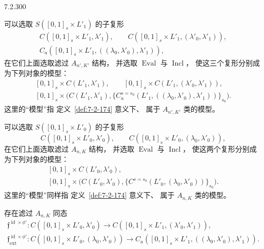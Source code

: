 
\begin{lemma}{7.2.300}\label{lem:7-2-300}
\par\noindent\textbullet\quad
可以选取 $S([0,1]_s\times L'_1)$ 的子复形
\[
\begin{gathered}
C([0,1]_s\times L'_1,\lambda'_1),\qquad
C([0,1]_s\times L'_1,(\lambda'_0,\lambda'_1)),\\
C_a([0,1]_s\times L'_1,((\lambda_0,\lambda'_0),\lambda'_1)),
\end{gathered}
\]
在它们上面选取滤过 $A_{n',K'}$ 结构，
并选取 $\operatorname{Eval}$ 与 $\operatorname{Incl}$，
使这三个复形分别成为下列对象的模型：
\[
\begin{gathered}
[0,1]_s\times C(L'_1,\lambda'_1),\qquad
[0,1]_s\times C(L'_1,(\lambda'_0,\lambda'_1)),\\
[0,1]_s\times
\bigl(C(L'_1,\lambda'_1),
\{C_a^{s=s_0}
(L'_1,((\lambda_0,\lambda'_0),\lambda'_1))\}_{s_0}\bigr).
\end{gathered}
\]
这里的“模型”指
定义~\ref{def:7-2-174} 意义下、
属于 $A_{n',K'}$ 类的模型。

\par\noindent\textbullet\quad
可以选取 $S([0,1]_s\times L'_0)$ 的子复形
\[
C([0,1]_s\times L'_0,\lambda'_0),\qquad
C([0,1]_s\times L'_0,(\lambda_0,\lambda'_0)),
\]
在它们上面选取滤过 $A_{n,K}$ 结构，
并选取 $\operatorname{Eval}$ 与 $\operatorname{Incl}$，
使这两个复形分别成为下列对象的模型：
\[
\begin{gathered}
[0,1]_s\times C(L'_0,\lambda'_0),\\
[0,1]_s\times
\bigl(C(L'_0,\lambda'_0),
\{C^{s=s_0}(L'_0,(\lambda_0,\lambda'_0))\}_{s_0}\bigr).
\end{gathered}
\]
这里的“模型”同样指
定义~\ref{def:7-2-174} 意义下、
属于 $A_{n,K}$ 类的模型。

\par\noindent\textbullet\quad
存在滤过 $A_{n,K}$ 同态
\[
\begin{gathered}
\mathfrak f^{\operatorname{id}\times\phi'}\colon
C([0,1]_s\times L'_0,\lambda'_0)
\longrightarrow
C([0,1]_s\times L'_1,(\lambda'_0,\lambda'_1)),\\
\mathfrak f^{\operatorname{id}\times\phi'}_{\mathrm{ext}}\colon
C([0,1]_s\times L'_0,(\lambda_0,\lambda'_0))
\longrightarrow
C_a([0,1]_s\times L'_1,((\lambda_0,\lambda'_0),\lambda'_1)).
\end{gathered}
\]


\end{lemma}
